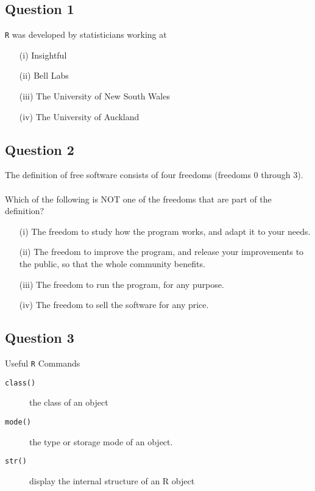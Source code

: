 \documentclass[12pt]{article}
\begin{document}
	

\subsection*{Question 1}
\Large
\texttt{R} was developed by statisticians working at
\begin{itemize}
	\item[(i)] Insightful
	\item[(ii)] Bell Labs
	\item[(iii)] The University of New South Wales
	\item[(iv)] The University of Auckland
\end{itemize}

\newpage
\subsection*{Question 2}
\Large
The definition of free software consists of four freedoms (freedoms 0 through 3). \\ \\Which of the following is NOT one of the freedoms that are part of the definition?
\begin{itemize}
	\item[(i)] The freedom to study how the program works, and adapt it to your needs.
	\item[(ii)] The freedom to improve the program, and release your improvements to the public, so that the whole community benefits.
	\item[(iii)] The freedom to run the program, for any purpose.
	\item[(iv)] The freedom to sell the software for any price.
\end{itemize}

\newpage
\subsection*{Question 3}
\Large
Useful \texttt{R} Commands
\begin{description}
\item[\texttt{class()}] the class of an object
\item[\texttt{mode()}]  the type or storage mode of an object.
\item[\texttt{str()}] display the internal structure of an R object
\end{description}
\end{document}
